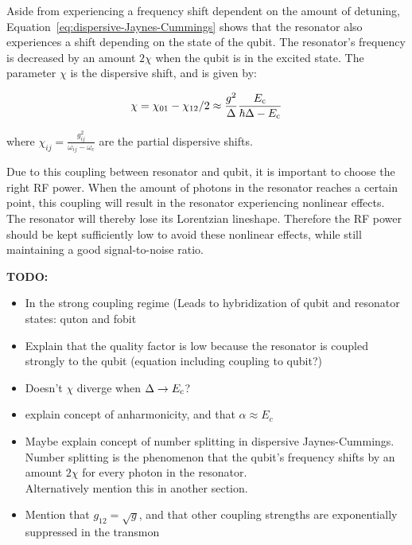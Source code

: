         Aside from experiencing a frequency shift dependent on the amount of detuning, Equation~\ref{eq:dispersive-Jaynes-Cummings} shows that the resonator also experiences a shift depending on the state of the qubit. The resonator's frequency is decreased by an amount $2 \chi$ when the qubit is in the excited state. The parameter $\chi$ is the dispersive shift, and is given by:

        \begin{equation}
          \chi = \chi_{01} - \chi_{12}/2 \approx \frac{g^2}{\Delta}\frac{E_\text{c}}{\hbar \Delta - E_\text{c}}
          \label{eq:dispersive-shift}
        \end{equation}

        where $\chi_{ij} = \frac{g_{ij}^2}{\omega_{ij}-\omega_c}$ are the partial dispersive shifts.

        Due to this coupling between resonator and qubit, it is important to choose the right RF power. When the amount of photons in the resonator reaches a certain point, this coupling will result in the resonator experiencing nonlinear effects. The resonator will thereby lose its Lorentzian lineshape. Therefore the RF power should be kept sufficiently low to avoid these nonlinear effects, while still maintaining a good signal-to-noise ratio.



        \textbf{TODO:}
        \begin{itemize}
          \item In the strong coupling regime (Leads to hybridization of qubit and resonator states: quton and fobit
          \item Explain that the quality factor is low because the resonator is coupled strongly to the qubit (equation including coupling to qubit?)
          \item Doesn't $\chi$ diverge when $\Delta \rightarrow E_\text{c}$?
          \item explain concept of anharmonicity, and that $\alpha \approx E_c$
          \item Maybe explain concept of number splitting in dispersive Jaynes-Cummings. Number splitting is the phenomenon that the qubit's frequency shifts by an amount $2 \chi$ for every photon in the resonator.\\
                Alternatively mention this in another section.
          \item Mention that $g_{12}=\sqrt{g}$, and that other coupling strengths are exponentially suppressed in the transmon
        \end{itemize}

